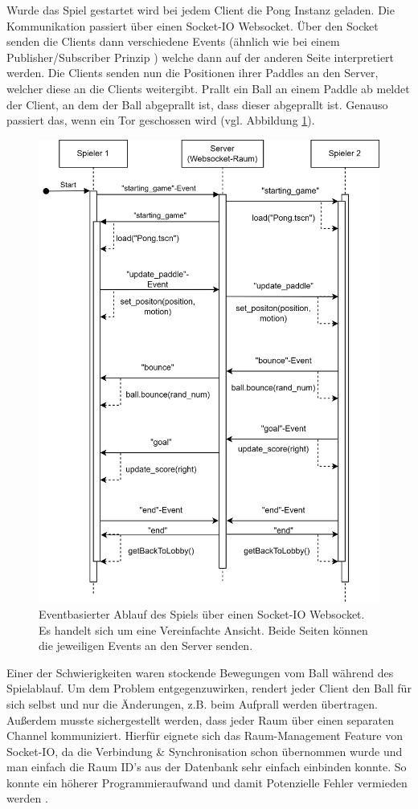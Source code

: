 \documentclass[
]{article}
\begin{document}
Wurde das Spiel gestartet wird bei jedem Client die Pong Instanz geladen. Die Kommunikation passiert über einen Socket-IO Websocket. Über den Socket senden die Clients dann verschiedene Events (ähnlich wie bei einem Publisher/Subscriber Prinzip \cite{tanenbaum2007distributed}) welche dann auf der anderen Seite interpretiert werden. Die Clients senden nun die Positionen ihrer Paddles an den Server, welcher diese an die Clients weitergibt. Prallt ein Ball an einem Paddle ab meldet der Client, an dem der Ball abgeprallt ist, dass dieser abgeprallt ist. Genauso passiert das, wenn ein Tor geschossen wird (vgl. Abbildung \ref{fig:ablaufdiagramm-spiel}). 
\begin{figure}[H]
	\centering
	\includegraphics[width=\textwidth -120pt ]{resources/Event-Based-Spielablauf.png}
	\caption{Eventbasierter Ablauf des Spiels über einen Socket-IO Websocket. Es handelt sich um eine Vereinfachte Ansicht. Beide Seiten können die jeweiligen Events an den Server senden.}
	\label{fig:ablaufdiagramm-spiel}
\end{figure}
Einer der Schwierigkeiten waren stockende Bewegungen vom Ball während des Spielablauf. Um dem Problem entgegenzuwirken, rendert jeder Client den Ball für sich selbst und nur die Änderungen, z.B. beim Aufprall werden übertragen. 
Außerdem musste sichergestellt werden, dass jeder Raum über einen separaten Channel kommuniziert. Hierfür eignete sich das Raum-Management Feature von Socket-IO, da die Verbindung \& Synchronisation schon übernommen wurde und man einfach die Raum ID's aus der Datenbank sehr einfach einbinden konnte. So konnte ein höherer Programmieraufwand und damit Potenzielle Fehler vermieden werden \cite{SocketIORooms}. 
\end{document}
